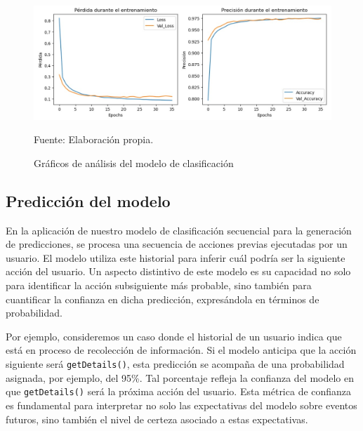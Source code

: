 \begin{figure}[H]
    \begin{minipage}[t]{0.9\textwidth}
        \caption{Gráficos de análisis del modelo de clasificación}
        \label{gráfico_clasificación}        
    \end{minipage}

    \vspace{10pt}

    \begin{minipage}[b]{1\textwidth}
        \centering
        \includegraphics[width=\textwidth]{img/Gráfico modelo clasificación.jpg}        
    \end{minipage}

    \begin{minipage}[t]{0.9\textwidth}
        Fuente: Elaboración propia.
    \end{minipage}
\end{figure}

\subsection{Predicción del modelo}

En la aplicación de nuestro modelo de clasificación secuencial para la generación de predicciones, se procesa una secuencia de acciones previas ejecutadas por un usuario. El modelo utiliza este historial para inferir cuál podría ser la siguiente acción del usuario. Un aspecto distintivo de este modelo es su capacidad no solo para identificar la acción subsiguiente más probable, sino también para cuantificar la confianza en dicha predicción, expresándola en términos de probabilidad.

Por ejemplo, consideremos un caso donde el historial de un usuario indica que está en proceso de recolección de información. Si el modelo anticipa que la acción siguiente será \texttt{getDetails()}, esta predicción se acompaña de una probabilidad asignada, por ejemplo, del 95\%. Tal porcentaje refleja la confianza del modelo en que \texttt{getDetails()} será la próxima acción del usuario. Esta métrica de confianza es fundamental para interpretar no solo las expectativas del modelo sobre eventos futuros, sino también el nivel de certeza asociado a estas expectativas.

